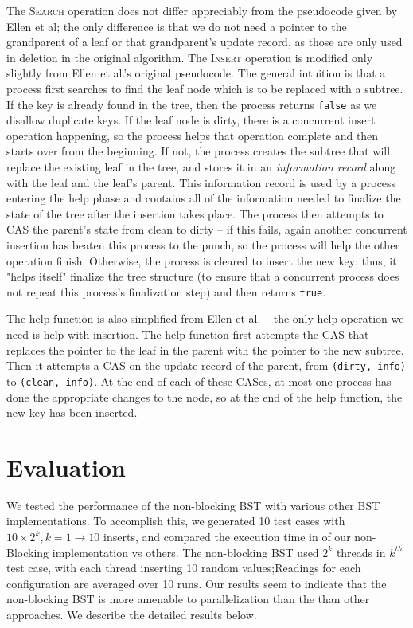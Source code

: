 \documentclass[10pt,pdftex,a4paper]{article}%
\begin{document}
\begin{multicols}{2}
The \textsc{Search} operation does not differ appreciably from the pseudocode given by Ellen et al; the only difference is that we do not need a pointer to the grandparent of a leaf or that grandparent's update record, as those are only used in deletion in the original algorithm.  The \textsc{Insert} operation is modified only slightly from Ellen et al.'s original pseudocode.  The general intuition is that a process first searches to find the leaf node which is to be replaced with a subtree.  If the key is already found in the tree, then the process returns \texttt{false} as we disallow duplicate keys. If the leaf node is dirty, there is a concurrent insert operation happening, so the process helps that operation complete and then starts over from the beginning.  If not, the process creates the subtree that will replace the existing leaf in the tree, and stores it in an \textit{information record} along with the leaf and the leaf's parent.  This information record is used by a process entering the help phase and contains all of the information needed to finalize the state of the tree after the insertion takes place.  The process then attempts to CAS the parent's state from clean to dirty -- if this fails, again another concurrent insertion has beaten this process to the punch, so the process will help the other operation finish.  Otherwise, the process is cleared to insert the new key; thus, it "helps itself" finalize the tree structure (to ensure that a concurrent process does not repeat this process's finalization step) and then returns \texttt{true}.

The help function is also simplified from Ellen et al. -- the only help operation we need is help with insertion.  The help function first attempts the CAS that replaces the pointer to the leaf in the parent with the pointer to the new subtree.  Then it attempts a CAS on the update record of the parent, from \texttt{(dirty, info)} to \texttt{(clean, info)}.  At the end of each of these CASes, at most one process has done the appropriate changes to the node, so at the end of the help function, the new key has been inserted.

\section{Evaluation}
We tested the performance of the non-blocking BST with various other BST implementations. To accomplish this, we generated 10 test cases with $10\times2^k, k = 1 \to 10 $ inserts, and compared the execution time in of our non-Blocking implementation vs others. The non-blocking BST used $2^k$ threads in $k^{th}$ test case, with each thread inserting 10 random values;Readings for each configuration are averaged over 10 runs. Our results seem to indicate that the non-blocking BST is more amenable to parallelization than the than other approaches. We describe the detailed results below. 

\end{multicols}
\end{document}
